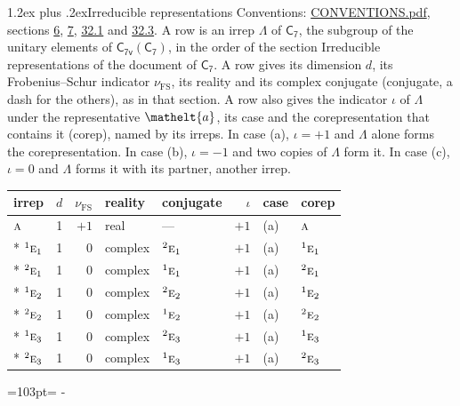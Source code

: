 \documentclass[10pt,a4paper]{article}
\makeatletter
\renewcommand\section{\@startsection{section}{1}{\z@}{-3ex plus -1ex minus -.2ex}%
  {1.2ex plus .2ex}{\normalfont\large\sffamily\bfseries\color{parttitle}}}
\newcommand{\needspace}[1]{\par\penalty-100\begingroup\dimen0=#1\relax\dimen2=\pagegoal
  \advance\dimen2-\pagetotal\ifdim\dimen0>\dimen2\relax\ifdim\dimen2>0pt\vfil\break\fi\fi
  \endgroup}
\numberwithin{equation}{section}
\newcommand{\eltfont}[1]{{\let\sigma\eltsigma\mathelt{#1}}}
\newcommand{\grp}[1]{\mathsf{#1}}
\newcommand{\irr}[1]{\text{\normalfont\scshape #1}}
\newcommand{\conjpair}[1]{{}^{#1}}
\newcommand{\elt}[1]{\eltfont{#1}}
\newcommand{\fsind}{\nu_{\mathrm{FS}}}
\makeatother
\begin{document}
\section{Irreducible representations}\label{s:irreps}
Conventions: \href{../../CONVENTIONS.pdf}{CONVENTIONS.pdf}, sections \href{../../../rotation/CONVENTIONS.pdf\#conv.6}{6}, \href{../../../rotation/CONVENTIONS.pdf\#conv.7}{7}, \href{../../CONVENTIONS.pdf\#conv.32.1}{32.1} and \href{../../CONVENTIONS.pdf\#conv.32.3}{32.3}.
\leavevmode\label{n:irrep.Delta}A row is an irrep $\Lambda$ of $\grp{C_{7}}$, the subgroup of the unitary elements of $\grp{C_{7v}}(\grp{C_{7}})$, in the order of the section Irreducible representations of the document of \href{../../../rotation/data/pdf/C7.pdf}{$\grp{C_{7}}$}. \label{n:index.dimension}\label{n:index.frobenius}\label{n:head.irrep}\label{n:head.reality}\label{n:head.conjugate}A row gives its dimension $d$, its Frobenius--Schur indicator $\fsind$, its reality and its complex conjugate (conjugate, a dash for the others), as in that section. \label{n:head.case.corep}\label{n:head.corep}A row also gives the indicator $\iota$ of $\Lambda$ under the representative $\elt{a}$, its case and the corepresentation that contains it (corep), named by its irreps. In case (a), $\iota = +1$ and $\Lambda$ alone forms the corepresentation. In case (b), $\iota = -1$ and two copies of $\Lambda$ form it. In case (c), $\iota = 0$ and $\Lambda$ forms it with its partner, another irrep.
\setlength{\emergencystretch}{2em}\par\setlength{\emergencystretch}{0pt}
{\small\renewcommand{\arraystretch}{1.25}\setlength{\tabcolsep}{4pt}\begin{longtable}{@{}lrrllrll@{}}\toprule
irrep & $d$ & $\fsind$ & reality & conjugate & $\iota$ & case & corep\\\midrule\endhead
\bottomrule\endfoot\endlastfoot
$\irr{a}$ & 1 & $+1$ & real & --- & $+1$ & (a) & $\irr{a}$\\*
$\conjpair{1}\irr{e}_{1}$ & 1 & $0$ & complex & $\conjpair{2}\irr{e}_{1}$ & $+1$ & (a) & $\conjpair{1}\irr{e}_{1}$\\*
$\conjpair{2}\irr{e}_{1}$ & 1 & $0$ & complex & $\conjpair{1}\irr{e}_{1}$ & $+1$ & (a) & $\conjpair{2}\irr{e}_{1}$\\*
$\conjpair{1}\irr{e}_{2}$ & 1 & $0$ & complex & $\conjpair{2}\irr{e}_{2}$ & $+1$ & (a) & $\conjpair{1}\irr{e}_{2}$\\*
$\conjpair{2}\irr{e}_{2}$ & 1 & $0$ & complex & $\conjpair{1}\irr{e}_{2}$ & $+1$ & (a) & $\conjpair{2}\irr{e}_{2}$\\*
$\conjpair{1}\irr{e}_{3}$ & 1 & $0$ & complex & $\conjpair{2}\irr{e}_{3}$ & $+1$ & (a) & $\conjpair{1}\irr{e}_{3}$\\*
$\conjpair{2}\irr{e}_{3}$ & 1 & $0$ & complex & $\conjpair{1}\irr{e}_{3}$ & $+1$ & (a) & $\conjpair{2}\irr{e}_{3}$\\
\bottomrule\end{longtable}}
\needspace{103pt}
\end{document}
